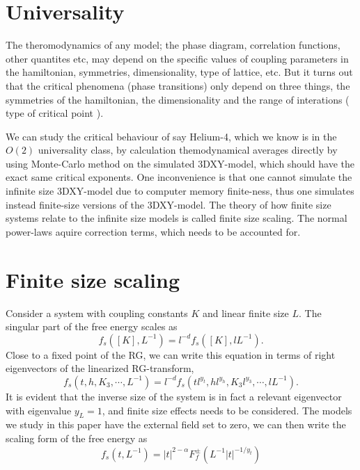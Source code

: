 \section{Universality}
The theromodynamics of any model; the phase diagram, correlation functions, other quantites etc, may depend on the specific values of coupling parameters in the hamiltonian, symmetries, dimensionality, type of lattice, etc. 
But it turns out that the critical phenomena (phase transitions) only depend on three things, the symmetries of the hamiltonian, the dimensionality and the range of interations ( type of critical point ).

We can study the critical behaviour of say Helium-4, which we know is in the $O(2)$ universality class, by calculation themodynamical averages directly by using Monte-Carlo method on the simulated 3DXY-model, which should have the exact same critical exponents. 
One inconvenience is that one cannot simulate the infinite size 3DXY-model due to computer memory finite-ness, thus one simulates instead finite-size versions of the 3DXY-model. The theory of how finite size systems relate to the infinite size models is called finite size scaling. The normal power-laws aquire correction terms, which needs to be accounted for.


\section{Finite size scaling}
Consider a system with coupling constants $K$ and linear finite size $L$. 
The singular part of the free energy scales as
\begin{equation}
  f_s([K],L^{-1}) = l^{-d}f_s([K],lL^{-1}).
  \label{}
\end{equation}
Close to a fixed point of the RG, we can write this equation in terms of right eigenvectors of the linearized RG-transform,
\begin{equation}
  f_s(t,h,K_3,\cdots,L^{-1}) = l^{-d}f_s(tl^{y_t},hl^{y_h},K_3 l^{y_3},\cdots,lL^{-1}).
  \label{}
\end{equation}
It is evident that the inverse size of the system is in fact a relevant eigenvector with eigenvalue $y_L = 1$, and finite size effects needs to be considered. 
The models we study in this paper have the external field set to zero, we can then write the scaling form of the free energy as
\begin{equation}
  f_s(t,L^{-1}) = |t|^{2-\alpha}F_{f}^{\pm}(L^{-1}|t|^{-1/y_t})
  \label{}
\end{equation}

